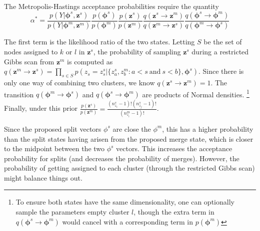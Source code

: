 \documentclass{article}
\begin{document}
 The Metropolis-Hastings acceptance probabilities require the quantity
$$\alpha^* =\frac{p(Y|\boldsymbol{\phi}^{s},\mathbf{z}^{s})}{p(Y|\boldsymbol{\phi}^{m},\mathbf{z}^{m})}  \frac{p(\boldsymbol{\phi}^{s})}{p(\boldsymbol{\phi}^{m})} \frac{p(\mathbf{z}^{s})}{p(\mathbf{z}^{m})} \frac{q(\mathbf{z}^{s} \rightarrow \mathbf{z}^{m})}{q( \mathbf{z}^{m} \rightarrow \mathbf{z}^{s})} \frac{q(\boldsymbol{\phi}^{s} \rightarrow \boldsymbol{\phi}^{m})}{q(\boldsymbol{\phi}^{m} \rightarrow \boldsymbol{\phi}^{s})}$$

The first term is the likelihood ratio of the two states.  Letting $S$ be the set of nodes assigned to $k$ or $l$ in $\mathbf{z}^{s}$, the probability of sampling $\mathbf{z}^{s}$ during a restricted Gibbs scan from  $\mathbf{z}^{m}$ is computed as $q( \mathbf{z}^{m} \rightarrow \mathbf{z}^{s}) = \prod_{s \in S} p(z_{s}=z_s^{s} |\{ z_a^{s},z_{b}^{m}: a  < s \ \mbox{and} \ s < b\}, \boldsymbol{\phi}^{s})$.  Since there is only one way of combining two clusters, we know $q(\mathbf{z}^{s} \rightarrow \mathbf{z}^{m})=1$.   The transition $q(\boldsymbol{\phi}^{m} \rightarrow \boldsymbol{\phi}^{s})$ and 
$q(\boldsymbol{\phi}^{s} \rightarrow
\boldsymbol{\phi}^{m})$ are products of Normal densities. \footnote{To ensure both states have the same dimensionality, one can optionally sample the parameters empty cluster $l$, though the extra term  in $q(\boldsymbol{\phi}^{s} \rightarrow \boldsymbol{\phi}^{m})$ would cancel with a corresponding term in $p(\boldsymbol{\phi}^{m})$}  Finally, under this prior $ \frac{p(\mathbf{z}^{s})}{p(\mathbf{z}^{m})} = \frac{(n_{z_i}^{s} - 1)!(n_{z_j}^{s} - 1)!}{(n_{z_i}^{m}-1)!}$.  

Since the proposed split vectors $\phi^s$ are close the $\phi^m$, this has a higher probability than the split states having arisen from the proposed merge state, which is closer to the midpoint between the two $\phi^s$ vectors.  This increases the acceptance probability for splits (and decreases the probability of merges).  However, the probability of getting assigned to each cluster (through the restricted Gibbs scan) might balance things out.




\end{document}
